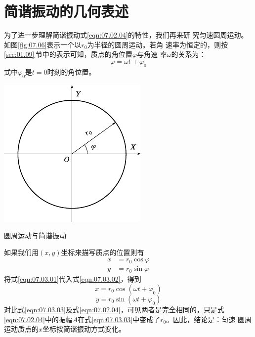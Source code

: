 \section{简谐振动的几何表述}\label{sec:07.03}

为了进一步理解简谐振动\lhbrak 式\eqref{eqn:07.02.04}\rhbrak 的特性，我们再来研
究匀速圆周运动。如图\ref{fig:07.06}\;表示一个以$ r _ { 0 } $为半径的圆周运动。若角
速率为恒定的，则按\ref{sec:01.09}\,节中的表示可知，质点的角位置$ \varphi $与角速
率$ \omega $的关系为：
\begin{equation}\label{eqn:07.03.01}
  \varphi = \omega t + \varphi _ { 0 }
\end{equation}
式中$ \varphi _ { 0 } $是$  t = 0   $时刻的角位置。

\begin{figurex}
  \centering
  \includegraphics{figure/fig07.06}
  \caption{圆周运动与简谐振动}
  \label{fig:07.06}
\end{figurex}

如果我们用$ \left(x, y\right) $坐标来描写质点的位置则有
\begin{equation}\label{eqn:07.03.02}
  \begin{aligned}
    x & = r _ { 0 } \cos \varphi \\
    y & = r _ { 0 } \sin \varphi
  \end{aligned}
\end{equation}
将式\eqref{eqn:07.03.01}代入式\eqref{eqn:07.03.02}，得到
\begin{equation*}
  x = r _ { 0 } \cos \left( \omega t + \varphi _ { 0 } \right)
\end{equation*}
\begin{equation}\label{eqn:07.03.03}
  y = r _ { 0 } \sin \left( \omega t + \varphi _ { 0 } \right)
\end{equation}
对比式\eqref{eqn:07.03.03}及式\eqref{eqn:07.02.04}，可见两者是完全相同的，只是式
\eqref{eqn:07.02.04}中的振幅$ A $在式\eqref{eqn:07.03.03}中变成了$ r _ { 0 } $。因此，结论是：匀速
圆周运动质点的$ x $坐标按简谐振动方式变化。


